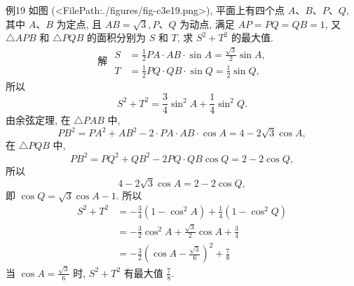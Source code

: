 例19 如图 (<FilePath:./figures/fig-c3e19.png>), 平面上有四个点 $A 、 B 、 P 、 Q$, 其中 $A 、 B$ 为定点, 且 $A B=\sqrt{3}, P 、 Q$ 为动点, 满足 $A P=P Q=Q B=1$, 又 $\triangle A P B$ 和 $\triangle P Q B$ 的面积分别为 $S$ 和 $T$, 求 $S^2+T^2$ 的最大值.
$$
\text { 解 } \begin{aligned}
S & =\frac{1}{2} P A \cdot A B \cdot \sin A=\frac{\sqrt{3}}{2} \sin A, \\
T & =\frac{1}{2} P Q \cdot Q B \cdot \sin Q=\frac{1}{2} \sin Q,
\end{aligned}
$$
所以
$$
S^2+T^2=\frac{3}{4} \sin ^2 A+\frac{1}{4} \sin ^2 Q .
$$
由余弦定理, 在 $\triangle P A B$ 中,
$$
P B^2=P A^2+A B^2-2 \cdot P A \cdot A B \cdot \cos A=4-2 \sqrt{3} \cos A,
$$
在 $\triangle P Q B$ 中,
$$
P B^2=P Q^2+Q B^2-2 P Q \cdot Q B \cos Q=2-2 \cos Q,
$$
所以
$$
4-2 \sqrt{3} \cos A=2-2 \cos Q,
$$
即 $\cos Q=\sqrt{3} \cos A-1$.
所以
$$
\begin{aligned}
S^2+T^2 & =-\frac{3}{4}\left(1-\cos ^2 A\right)+\frac{1}{4}\left(1-\cos ^2 Q\right) \\
& =-\frac{3}{2} \cos ^2 A+\frac{\sqrt{3}}{2} \cos A+\frac{3}{4} \\
& =-\frac{3}{2}\left(\cos A-\frac{\sqrt{3}}{6}\right)^2+\frac{7}{8}
\end{aligned}
$$
当 $\cos A=\frac{\sqrt{3}}{6}$ 时, $S^2+T^2$ 有最大值 $\frac{7}{8}$.



